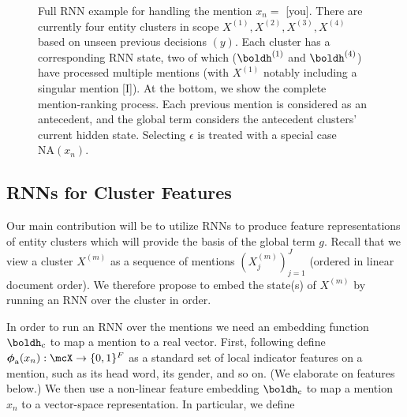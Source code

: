\documentclass[11pt,letterpaper]{article}
\newcommand{\aphi}{\boldsymbol{\phi}_{\mathrm{a}}}
\newcommand{\uc}{\ensuremath{\mathrm{c}}}
\newcommand{\hc}{\boldh_{\uc}}
\begin{document}
\begin{figure*}
\caption{\small Full RNN example for handling the mention $x_n =$ [you]. There are currently four entity clusters in scope $X^{(1)}, X^{(2)}, X^{(3)}, X^{(4)}$ based on unseen previous decisions $(y)$. Each cluster has a corresponding RNN state, two of which ($\boldh^{(1)}$ and $\boldh^{(4)}$) have processed multiple mentions (with $X^{(1)}$ notably including a singular mention [I]). At the bottom, we show the complete mention-ranking process. Each previous mention is considered as an antecedent, and the global term considers the antecedent clusters' current hidden state. Selecting $\epsilon$ is treated with a special case $\mathrm{NA}(x_n)$. 
}
\label{fig:hidden} 
\end{figure*}


\subsection{RNNs for Cluster Features}
Our main contribution will be to utilize RNNs to produce
feature representations of entity clusters which will provide the basis of the global term $g$. Recall that we view a cluster $X^{(m)}$ as a sequence of mentions $(X^{(m)}_j)_{j=1}^J$ (ordered in linear document order). We therefore propose to embed the state(s) of $X^{(m)}$ by running an RNN over the cluster in order.

In order to run an RNN over the mentions we need an embedding function $\hc$ to map a mention to a real vector. First, following  define $\aphi(x_n):\mcX \rightarrow \{0,1\}^F$ as a standard set of local indicator features on a mention, such as its head word, its gender, and so on. (We elaborate on features below.) We then use a non-linear feature embedding $\hc$ to map a mention $x_n$ to a vector-space representation. In particular, we define
\end{document}
